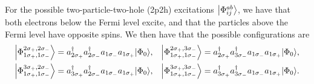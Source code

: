 For the possible two-particle-two-hole (2p2h) excitations $\ket*{\Phi_{ij}^{ab}}$, we have that both electrons below the Fermi level excite, and that the particles above the Fermi level have opposite spins.
We then have that the possible configurations are
\begin{align*}
    \ket*{\Phi_{1\sigma_{+}, 1\sigma_{-}}^{2\sigma_{+}, 2\sigma_{-}}} &= a_{2\sigma_{+}}^\dagger a_{2\sigma_{-}}^\dagger a_{1\sigma_{-}} a_{1\sigma_{+}} \ket*{\Phi_0}, &
    \ket*{\Phi_{1\sigma_{+}, 1\sigma_{-}}^{2\sigma_{+}, 3\sigma_{-}}} &= a_{2\sigma_{+}}^\dagger a_{3\sigma_{-}}^\dagger a_{1\sigma_{-}} a_{1\sigma_{+}} \ket*{\Phi_0}, \\
    \ket*{\Phi_{1\sigma_{+}, 1\sigma_{-}}^{3\sigma_{+}, 2\sigma_{-}}} &= a_{3\sigma_{+}}^\dagger a_{2\sigma_{-}}^\dagger a_{1\sigma_{-}} a_{1\sigma_{+}} \ket*{\Phi_0}, &
    \ket*{\Phi_{1\sigma_{+}, 1\sigma_{-}}^{3\sigma_{+}, 3\sigma_{-}}} &= a_{3\sigma_{+}}^\dagger a_{3\sigma_{-}}^\dagger a_{1\sigma_{-}} a_{1\sigma_{+}} \ket*{\Phi_0}.
\end{align*}

